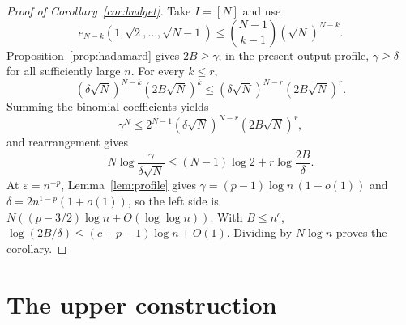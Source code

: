 \documentclass[10pt]{article}
\theoremstyle{definition}
\begin{document}
\begin{proof}[Proof of Corollary~\ref{cor:budget}]
Take \(I=[N]\) and use
\[
 e_{N-k}(1,\sqrt2,\ldots,\sqrt{N-1})
 \le\binom{N-1}{k-1}(\sqrt N)^{N-k}.
\]
Proposition~\ref{prop:hadamard} gives \(2B\ge\gamma\); in the present output
profile, \(\gamma\ge\delta\) for all sufficiently large \(n\).  For every
\(k\le r\),
\[
 (\delta\sqrt N)^{N-k}(2B\sqrt N)^k
 \le(\delta\sqrt N)^{N-r}(2B\sqrt N)^r.
\]
Summing the binomial coefficients yields
\[
 \gamma^N\le
 2^{N-1}(\delta\sqrt N)^{N-r}(2B\sqrt N)^r,
\]
and rearrangement gives
\[
 N\log\frac{\gamma}{\delta\sqrt N}
 \le(N-1)\log2+r\log\frac{2B}{\delta}.
\]
At \(\varepsilon=n^{-p}\), Lemma~\ref{lem:profile} gives
\(\gamma=(p-1)\log n\,(1+o(1))\) and
\(\delta=2n^{1-p}(1+o(1))\), so the left side is
\(N((p-3/2)\log n+O(\log\log n))\).  With \(B\le n^c\),
\(\log(2B/\delta)\le(c+p-1)\log n+O(1)\).  Dividing by
\(N\log n\) proves the corollary.
\end{proof}

\section{The upper construction}\label{app:construction}
\end{document}
